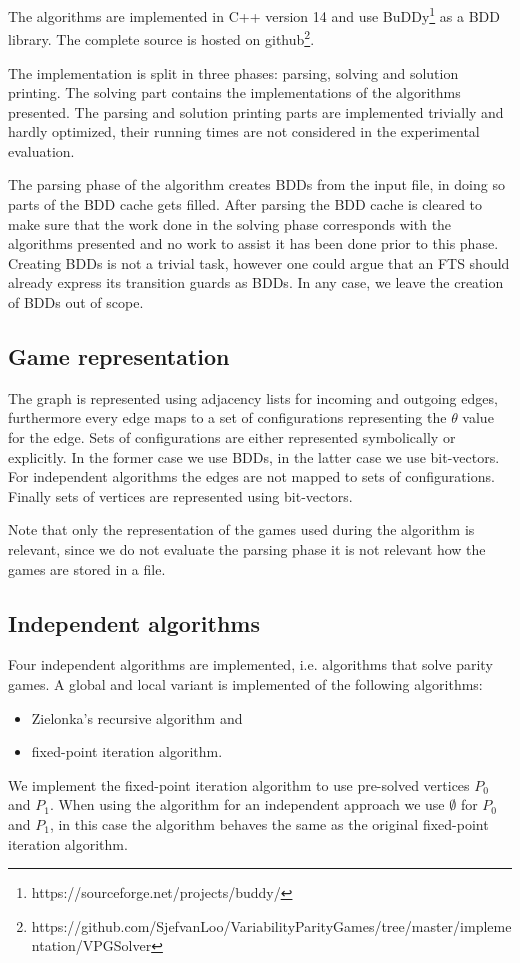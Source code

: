 The algorithms are implemented in C++ version 14 and use BuDDy\footnote{\label{note1}https://sourceforge.net/projects/buddy/} as a BDD library. The complete source is hosted on github\footnote{\label{note2}https://github.com/SjefvanLoo/VariabilityParityGames/tree/master/implementation/VPGSolver}.

The implementation is split in three phases: parsing, solving and solution printing. The solving part contains the implementations of the algorithms presented. The parsing and solution printing parts are implemented trivially and hardly optimized, their running times are not considered in the experimental evaluation.

The parsing phase of the algorithm creates BDDs from the input file, in doing so parts of the BDD cache gets filled. After parsing the BDD cache is cleared to make sure that the work done in the solving phase corresponds with the algorithms presented and no work to assist it has been done prior to this phase. Creating BDDs is not a trivial task, however one could argue that an FTS should already express its transition guards as BDDs. In any case, we leave the creation of BDDs out of scope.

\subsection{Game representation}
The graph is represented using adjacency lists for incoming and outgoing edges, furthermore every edge maps to a set of configurations representing the $\theta$ value for the edge. Sets of configurations are either represented symbolically or explicitly. In the former case we use BDDs, in the latter case we use bit-vectors. For independent algorithms the edges are not mapped to sets of configurations. Finally sets of vertices are represented using bit-vectors.

Note that only the representation of the games used during the algorithm is relevant, since we do not evaluate the parsing phase it is not relevant how the games are stored in a file.
\subsection{Independent algorithms}
Four independent algorithms are implemented, i.e. algorithms that solve parity games. A global and local variant is implemented of the following algorithms:
\begin{itemize}
	\item Zielonka's recursive algorithm and
	\item fixed-point iteration algorithm.
\end{itemize}
We implement the fixed-point iteration algorithm to use pre-solved vertices $P_0$ and $P_1$. When using the algorithm for an independent approach we use $\emptyset$ for $P_0$ and $P_1$, in this case the algorithm behaves the same as the original fixed-point iteration algorithm.

